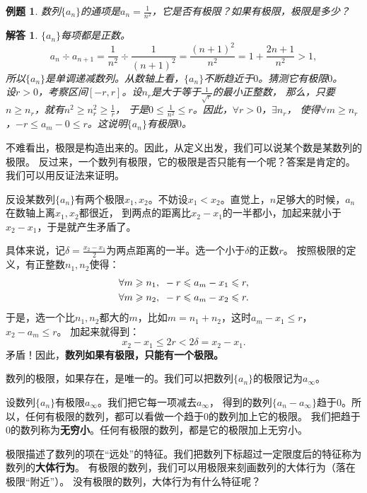 \documentclass[12pt,UTF8]{ctexbook}
\newtheorem{et}{例题}[section]
\newtheorem*{so}{解答}
\begin{document}
\begin{et}
数列$\{a_n\}$的通项是$a_n = \frac{1}{n^2}$，它是否有极限？如果有极限，极限是多少？    
\end{et}
\begin{so}
    $\{a_n\}$每项都是正数。
    $$a_{n} \div a_{n+1} = \frac{1}{n^2} \div \frac{1}{(n+1)^2} = \frac{(n+1)^2}{n^2} = 1 + \frac{2n+1}{n^2} > 1,$$
    所以$\{a_n\}$是单调递减数列。从数轴上看，$\{a_n\}$不断趋近于$0$。猜测它有极限$0$。\\
    设$r>0$，考察区间$[-r,r]$。设$n_r$是大于等于$\frac{1}{\sqrt{r}}$的最小正整数，
    那么，只要$n \geqslant n_r$，就有$n^2 \geqslant n_r^2 \geqslant \frac{1}{r}$，
    于是$0 \leqslant \frac{1}{n^2} \leqslant r$。因此，$\forall r > 0$，$\exists n_r$，
    使得$\forall m \geqslant n_r$，$ -r  \leqslant a_m - 0 \leqslant r$。这说明$\{a_n\}$有极限$0$。    
\end{so}

不难看出，极限是构造出来的。因此，从定义出发，我们可以说某个数是某数列的极限。
反过来，一个数列有极限，它的极限是否只能有一个呢？答案是肯定的。我们可以用反证法来证明。

反设某数列$\{a_n\}$有两个极限$x_1, x_2$。不妨设$x_1 < x_2$。直觉上，$n$足够大的时候，$a_n$在数轴上离$x_1, x_2$都很近，
到两点的距离比$x_2 - x_1$的一半都小，加起来就小于$x_2 - x_1$，于是就产生矛盾了。

具体来说，记$\delta = \frac{x_2 - x_1}{2}$为两点距离的一半。选一个小于$\delta$的正数$r$。
按照极限的定义，有正整数$n_1, n_2$使得：
\begin{align}
    \forall m \geqslant n_1 , \,\,\,& -r \leqslant a_m - x_1 \leqslant r , \notag \\
    \forall m \geqslant n_2 , \,\,\,& -r \leqslant a_m - x_2 \leqslant r . \notag 
\end{align}
于是，选一个比$n_1,n_2$都大的$m$，比如$m=n_1+n_2$，这时$a_m - x_1 \leqslant r$，$x_2 - a_m \leqslant r$。
加起来就得到：
$$x_2 - x_1 \leqslant 2r < 2\delta = x_2 - x_1.$$
矛盾！因此，\textbf{数列如果有极限，只能有一个极限。}

数列的极限，如果存在，是唯一的。我们可以把数列$\{a_n\}$的极限记为$a_\infty$。

设数列$\{a_n\}$有极限$a_\infty$。我们把它每一项减去$a_\infty$，
得到的数列$\{a_n - a_\infty\}$趋于$0$。所以，任何有极限的数列，都可以看做一个趋于$0$的数列加上它的极限。
我们把趋于$0$的数列称为\textbf{无穷小}。任何有极限的数列，都是它的极限加上无穷小。

极限描述了数列的项在“远处”的特征。我们把数列下标超过一定限度后的特征称为数列的\textbf{大体行为}。
有极限的数列，我们可以用极限来刻画数列的大体行为（落在极限“附近”）。
没有极限的数列，大体行为有什么特征呢？
\end{document}
